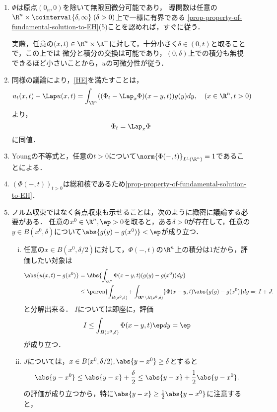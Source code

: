 \documentclass[uplatex,dvipdfmx]{jsreport}
\begin{document}
\begin{Proof}\mbox{}
    \begin{enumerate}
        \item 
        $\Phi$は原点$(0_n,0)$を除いて無限回微分可能であり，
        導関数は任意の$\R^n\times\cointerval{\delta,\infty}\;(\delta>0)$上で一様に有界である
        \ref{prop-property-of-fundamental-solution-to-EH}(5)ことを認めれば，すぐに従う．
        
        実際，任意の$(x,t)\in\R^n\times\R^+$に対して，十分小さく$\delta\in(0,t)$と取ることで，この上では
        微分と積分の交換は可能であり，$(0,\delta)$上での積分も無視できるほど小さいことから，$u$の可微分性が従う．
        \item 同様の議論により，\ref{HE}を満たすことは，
        \[u_t(x,t)-\Lap u(x,t)=\int_{\R^n}((\Phi_t-\Lap_x\Phi)(x-y,t))g(y)dy,\quad(x\in\R^n,t>0)\]
        より，
        \[\Phi_t=\Lap_x\Phi\]
        に同値．
        \item Youngの不等式と，任意の$t>0$について$\norm{\Phi(-,t)}_{L^1(\R^n)}=1$であることによる．
        \item $(\Phi(-,t))_{t>0}$は総和核であるため\ref{prop-property-of-fundamental-solution-to-EH}．
        \item ノルム収束ではなく各点収束も示せることは，次のように緻密に議論する必要がある．
        任意の$x^0\in\R^n,\ep>0$を取ると，ある$\delta>0$が存在して，任意の$y\in B(x^0,\delta)$について$\abs{g(y)-g(x^0)}<\ep$が成り立つ．
        \begin{enumerate}[(i)]
            \item 任意の$x\in B(x^0,\delta/2)$に対して，$\Phi(-,t)$の$\R^n$上の積分は$1$だから，評価したい対象は
            \begin{align*}
                \abs{u(x,t)-g(x^0)}&=\Abs{\int_{\R^n}\Phi(x-y,t)(g(y)-g(x^0))dy}\\
                &\le\paren{\int_{B(x^0,\delta)}+\int_{\R^n\setminus B(x^0,\delta)}}\Phi(x-y,t)\abs{g(y)-g(x^0)}dy=:I+J.
            \end{align*}
            と分解出来る．
            $I$については即座に，評価
            \[I\le\int_{B(x^0,\delta)}\Phi(x-y,t)\ep dy=\ep\]
            が成り立つ．
            \item $J$については，$x\in B(x^0,\delta/2),\abs{y-x^0}\ge\delta$とすると
            \[\abs{y-x^0}\le\abs{y-x}+\frac{\delta}{2}\le\abs{y-x}+\frac{1}{2}\abs{y-x^0}.\]
            の評価が成り立つから，特に$\abs{y-x}\ge\frac{1}{2}\abs{y-x^0}$に注意すると，
            \begin{align*}

\end{align*}
\end{enumerate}
\end{enumerate}
\end{Proof}
\end{document}
